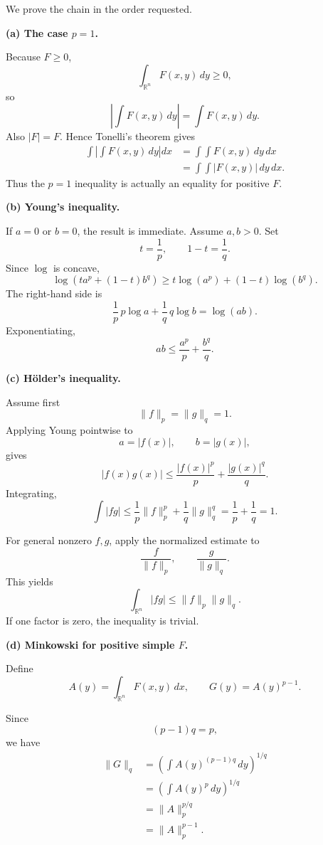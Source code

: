 \begin{solution}
We prove the chain in the order requested.

\par\smallskip\noindent\textbf{(a) The case \(p=1\).}

Because \(F\ge0\),
\[
\int_{\mathbb R^n}F(x,y)\,dy\ge0,
\]
so
\[
\left|
\int F(x,y)\,dy
\right|
=
\int F(x,y)\,dy.
\]
Also \(|F|=F\). Hence Tonelli's theorem gives
\[
\begin{aligned}
\int
\left|
\int F(x,y)\,dy
\right|dx
&=
\int\int F(x,y)\,dy\,dx\\
&=
\int\int |F(x,y)|\,dy\,dx.
\end{aligned}
\]
Thus the \(p=1\) inequality is actually an equality for positive \(F\).

\par\smallskip\noindent\textbf{(b) Young's inequality.}

If \(a=0\) or \(b=0\), the result is immediate. Assume \(a,b>0\).
Set
\[
t=\frac1p,
\qquad
1-t=\frac1q.
\]
Since \(\log\) is concave,
\[
\log\left(
t a^p+(1-t)b^q
\right)
\ge
t\log(a^p)
+
(1-t)\log(b^q).
\]
The right-hand side is
\[
\frac1p\,p\log a
+
\frac1q\,q\log b
=
\log(ab).
\]
Exponentiating,
\[
\boxed{
ab
\le
\frac{a^p}{p}
+
\frac{b^q}{q}.}
\]

\par\smallskip\noindent\textbf{(c) Hölder's inequality.}

Assume first
\[
\|f\|_p=\|g\|_q=1.
\]
Applying Young pointwise to
\[
a=|f(x)|,
\qquad
b=|g(x)|,
\]
gives
\[
|f(x)g(x)|
\le
\frac{|f(x)|^p}{p}
+
\frac{|g(x)|^q}{q}.
\]
Integrating,
\[
\int|fg|
\le
\frac1p\|f\|_p^p
+
\frac1q\|g\|_q^q
=
\frac1p+\frac1q
=
1.
\]

For general nonzero \(f,g\), apply the normalized estimate to
\[
\frac{f}{\|f\|_p},
\qquad
\frac{g}{\|g\|_q}.
\]
This yields
\[
\boxed{
\int_{\mathbb R^n}|fg|
\le
\|f\|_p\|g\|_q.}
\]
If one factor is zero, the inequality is trivial.

\par\smallskip\noindent\textbf{(d) Minkowski for positive simple \(F\).}

Define
\[
A(y)
=
\int_{\mathbb R^n}F(x,y)\,dx,
\qquad
G(y)=A(y)^{p-1}.
\]

Since
\[
(p-1)q=p,
\]
we have
\[
\begin{aligned}
\|G\|_q
&=
\left(
\int A(y)^{(p-1)q}\,dy
\right)^{1/q}\\
&=
\left(
\int A(y)^p\,dy
\right)^{1/q}\\
&=
\|A\|_p^{p/q}\\
&=
\boxed{\|A\|_p^{p-1}}.
\end{aligned}
\]


\end{solution}
